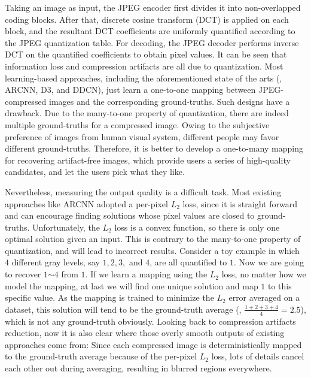 \documentclass[10pt,twocolumn,letterpaper]{article}
\begin{document}
Taking an image as input, the JPEG encoder first divides it into non-overlapped coding blocks. After that, discrete cosine transform (DCT) is applied on each block, and the resultant DCT coefficients are uniformly quantified according to the JPEG quantization table. For decoding, the JPEG decoder performs inverse DCT on the quantified coefficients to obtain pixel values. It can be seen that information loss and compression artifacts are all due to quantization. Most learning-based approaches, including the aforementioned state of the arts (\eg, ARCNN, D3, and DDCN), just learn a one-to-one mapping between JPEG-compressed images and the corresponding ground-truths. Such designs have a drawback. Due to the many-to-one property of quantization, there are indeed multiple ground-truths for a compressed image. Owing to the subjective preference of images from human visual system, different people may favor different ground-truths. Therefore, it is better to develop a one-to-many mapping for recovering artifact-free images, which provide users a series of high-quality candidates, and let the users pick what they like. 

Nevertheless, measuring the output quality is a difficult task. Most existing approaches like ARCNN adopted a per-pixel $L_2$ loss, since it is straight forward and can encourage finding solutions whose pixel values are closed to ground-truths. Unfortunately, the $L_2$ loss is a convex function, so there is only one optimal solution given an input. This is contrary to the many-to-one property of quantization, and will lead to incorrect results. Consider a toy example in which $4$ different gray levels, say $1, 2, 3,$ and $4$, are all quantified to $1$. Now we are going to recover $1$$\sim$$4$ from $1$. If we learn a mapping using the $L_2$ loss, no matter how we model the mapping, at last we will find one unique solution and map $1$ to this specific value. As the mapping is trained to minimize the $L_2$ error averaged on a dataset, this solution will tend to be the ground-truth average (\eg, $\frac{1+2+3+4}{4}=2.5$), which is not any ground-truth obviously. Looking back to compression artifacts reduction, now it is also clear where those overly smooth outputs of existing approaches come from: Since each compressed image is deterministically mapped to the ground-truth average because of the per-pixel $L_2$ loss, lots of details cancel each other out during averaging, resulting in blurred regions everywhere. 
\end{document}
